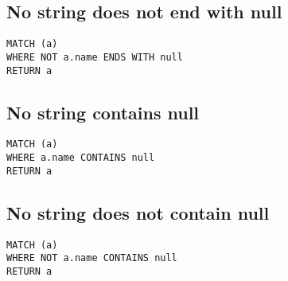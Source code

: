 \subsection{No string does not end with null}

\begin{lstlisting}
MATCH (a)
WHERE NOT a.name ENDS WITH null
RETURN a
\end{lstlisting}

\subsection{No string contains null}

\begin{lstlisting}
MATCH (a)
WHERE a.name CONTAINS null
RETURN a
\end{lstlisting}

\subsection{No string does not contain null}

\begin{lstlisting}
MATCH (a)
WHERE NOT a.name CONTAINS null
RETURN a
\end{lstlisting}

